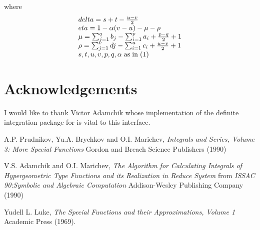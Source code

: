 where
\begin{displaymath}
\begin{array}{ll}
delta = s+t-\frac{u-v}{2}\\
eta = 1-\alpha(v-u)-\mu-\rho\\
\mu = \sum_{j=1}^{q} b_{j} - \sum_{i=1}^{p} a_{i} + \frac{p-q}{2} + 1\\
\rho = \sum_{j=1}^{v} d{j} - \sum_{i=1}^{u} c_{i} + \frac{u-v}{2} + 1\\
s,t,u,v,p,q,\alpha \; {\rm as \; in \; (1)}
\end{array}
\end{displaymath}


\section{Acknowledgements}
I would like to thank Victor Adamchik whose implementation of the
definite integration package for \REDUCE is vital to this
interface.


\begin{thebibliography}{}

 A.P. Prudnikov, Yu.A. Brychkov and O.I. Marichev,
{\em Integrals and Series, Volume 3: More Special Functions} Gordon
and Breach Science Publishers (1990)

 V.S. Adamchik and O.I. Marichev, {\em The
Algorithm for Calculating Integrals of Hypergeometric Type Functions
and its Realization in Reduce System} from {\em ISSAC 90:Symbolic and
Algebraic Computation} Addison-Wesley Publishing Company (1990)

 Yudell L. Luke, {\em The Special Functions and their
Approximations, Volume 1} Academic Press (1969).

\end{thebibliography}



